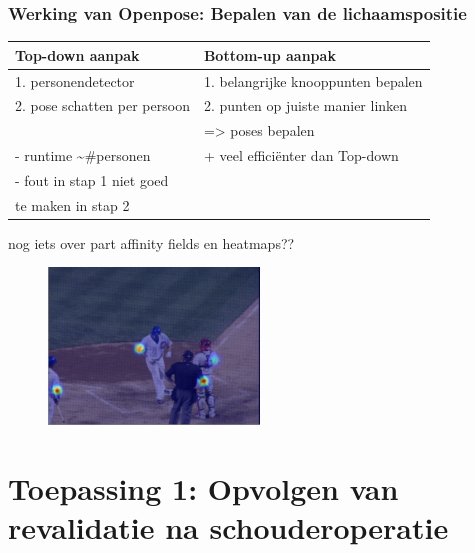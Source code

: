 \documentclass
   [kulak] %
   {kulakbeamer}
\begin{document}
\begin{frame}
\frametitle{Werking van Openpose: Bepalen van de lichaamspositie}

\begin{center}
	\begin{tabular}{l|l} 
		\textbf{Top-down aanpak} & \textbf{Bottom-up aanpak}\\
		\hline
		1. personendetector & 1. belangrijke knooppunten bepalen\\
		2. pose schatten per persoon & 2. punten op juiste manier linken\\
		& => poses bepalen\\
		\hline
		- runtime \textasciitilde \#personen  & + veel efficiënter dan Top-down\\
		- fout in stap 1 niet goed  & \\
		 te maken in stap 2 & \\
	\end{tabular}
\end{center}
\end{frame}

\begin{frame}
	nog iets over part affinity fields en heatmaps??
	\begin{figure}
		\centering
		\includegraphics[width=0.5\textwidth]{heatmap_1}
	\end{figure}
\end{frame}

\section{Toepassing 1: Opvolgen van revalidatie na schouderoperatie}
\end{document}
